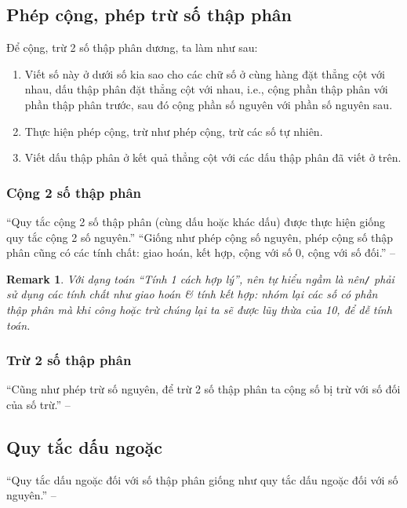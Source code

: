 \documentclass[oneside]{book}
\numberwithin{equation}{section}
\newtheorem{remark}{Remark}[section]
\begin{document}
\subsection{Phép cộng, phép trừ số thập phân}
Để cộng, trừ 2 số thập phân dương, ta làm như sau:
\begin{enumerate}
	\item Viết số này ở dưới số kia sao cho các chữ số ở cùng hàng đặt thẳng cột với nhau, dấu thập phân đặt thẳng cột với nhau, i.e., cộng phần thập phân với phần thập phân trước, sau đó cộng phần số nguyên với phần số nguyên sau.
	\item Thực hiện phép cộng, trừ như phép cộng, trừ các số tự nhiên.
	\item Viết dấu thập phân ở kết quả thẳng cột với các dấu thập phân đã viết ở trên.
\end{enumerate}

\subsubsection{Cộng 2 số thập phân}
``Quy tắc cộng 2 số thập phân (cùng dấu hoặc khác dấu) được thực hiện giống quy tắc cộng 2 số nguyên.'' ``Giống như phép cộng số nguyên, phép cộng số thập phân cũng có các tính chất: giao hoán, kết hợp, cộng với số 0, cộng với số đối.'' -- \cite[p. 49]{Thai_Anh_Dat_Ha_Loan_Nam_Quang_Toan_6_tap_2}

\begin{remark}
	Với dạng toán ``Tính 1 cách hợp lý'', nên tự hiểu ngầm là nên\emph{\texttt{/}} phải sử dụng các tính chất như giao hoán \textit{\&} tính kết hợp: nhóm lại các số có phần thập phân mà khi công hoặc trừ chúng lại ta sẽ được lũy thừa của 10, để dễ tính toán.
\end{remark}

\subsubsection{Trừ 2 số thập phân}
``Cũng như phép trừ số nguyên, để trừ 2 số thập phân ta cộng số bị trừ với số đối của số trừ.'' -- \cite[p. 50]{Thai_Anh_Dat_Ha_Loan_Nam_Quang_Toan_6_tap_2}

\subsection{Quy tắc dấu ngoặc}
``Quy tắc dấu ngoặc đối với số thập phân giống như quy tắc dấu ngoặc đối với số nguyên.'' -- \cite[p. 50]{Thai_Anh_Dat_Ha_Loan_Nam_Quang_Toan_6_tap_2}
\end{document}
